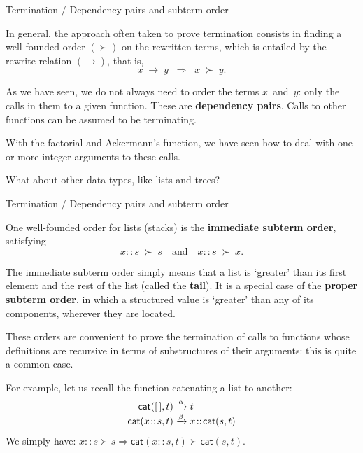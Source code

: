 \documentclass[compress,dvipdfmx]{beamer}
\newcommand\fun[1]{\textsf{#1}}
\newcommand\el{[\,]}
\newcommand\cons[2]{{#1}\!::\!{#2}}
\begin{document}
%
\begin{frame}{Termination / Dependency pairs and subterm order}

  In general, the approach often taken to prove termination consists
  in finding a well\hyp{}founded order \((\succ)\) on the rewritten
  terms, which is entailed by the rewrite relation \((\rightarrow)\),
  that is,
  \begin{equation*}
    x \; \rightarrow \; y \;\; \Rightarrow \;\; x \; \succ \; y.
  \end{equation*}

  \medskip

  As we have seen, we do not always need to order the terms
  \(x\)~and~\(y\): only the calls in them to a given function. These
  are \textbf{dependency pairs}. Calls to other functions can be
  assumed to be terminating.

  \bigskip

  With the factorial and Ackermann's function, we have seen how to
  deal with one or more integer arguments to these calls.

  \bigskip

  What about other data types, like lists and trees?

\end{frame}

%
\begin{frame}{Termination / Dependency pairs and subterm order}

  One well\hyp{}founded order for lists (stacks) is the
  \textbf{immediate subterm order}, satisfying
  \begin{equation*}
    \cons{x}{s} \; \succ \; s \quad \text{and} \quad \cons{x}{s} \;
    \succ \; x.
  \end{equation*}

  The immediate subterm order simply means that a list is `greater'
  than its first element and the rest of the list (called the
  \textbf{tail}). It is a special case of the \textbf{proper subterm
    order}, in which a structured value is `greater' than any of its
  components, wherever they are located.

  \bigskip

  These orders are convenient to prove the termination of calls to
  functions whose definitions are recursive in terms of substructures
  of their arguments: this is quite a common case.

  \bigskip

  For example, let us recall the function catenating a list to
  another:
  \begin{align*}
    \fun{cat}(        \el,t) &\xrightarrow{\alpha} t\\
    \fun{cat}(\cons{x}{s},t) &\xrightarrow{\smash{\beta}}
    \cons{x}{\fun{cat}(s,t)}
  \end{align*}
  We simply have: \(\cons{x}{s} \succ s \Rightarrow
  \fun{cat}(\cons{x}{s},t) \succ \fun{cat}(s,t).\)

\end{frame}
\end{document}
